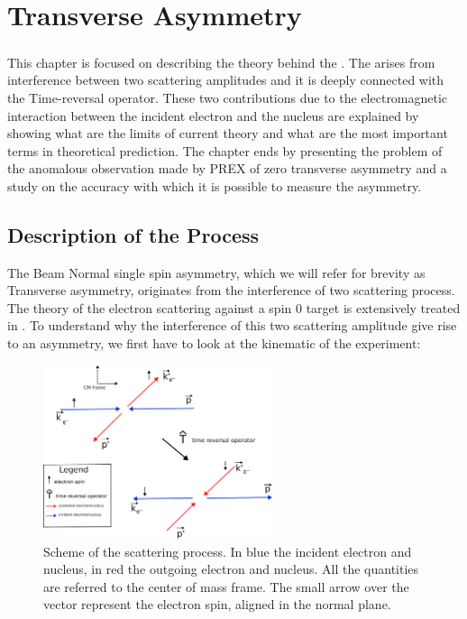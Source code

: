 
\chapter{Transverse Asymmetry} \label{transv}

\paragraph{}
This chapter is focused on describing the theory behind the \transv . The \transv arises from interference between two scattering amplitudes and it is deeply connected with the Time-reversal operator. These two contributions due to the electromagnetic interaction between the incident electron and the nucleus are explained by showing what are the limits of current theory and what are the most important terms in theoretical prediction. The chapter ends by presenting the problem of the anomalous observation made by PREX of zero transverse asymmetry and a study on the accuracy with which it is possible to measure the asymmetry. 

\section{Description of the Process}

The Beam Normal single spin asymmetry, which we will refer for brevity as Transverse asymmetry, originates from the interference of two scattering process. The theory of the electron scattering against a spin $0$ target is extensively treated in \cite{Gorchtein_2008}.
To understand why the interference of this two scattering amplitude give rise to an asymmetry, we first have to look at the kinematic of the experiment:  \newline

\begin{figure}[hbtp]
\centering
\includegraphics[width = 0.6\textwidth]{Transverse/scattering.pdf}
\caption{Scheme of the scattering process. In blue the incident electron and nucleus, in red the outgoing electron and nucleus. All the quantities are referred to the center of mass frame. The small arrow over the vector represent the electron spin, aligned in the normal plane.}
\end{figure}

